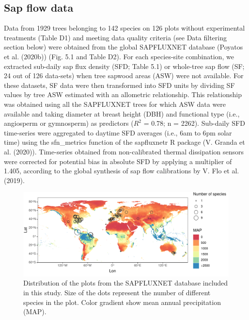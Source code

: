 \documentclass[11pt,twoside]{reedthesis}
\begin{document}
\subsection{Sap flow data}\label{sap-flow-data}

Data from 1929 trees belonging to 142 species on 126 plots without
experimental treatments (Table D1) and meeting data quality criteria
(see Data filtering section below) were obtained from the global
SAPFLUXNET database (Poyatos et al. (2020b)) (Fig. 5.1 and Table D2).
For each species-site combination, we extracted sub-daily sap flux
density (SFD; Table 5.1) or whole-tree sap flow (SF; 24 out of 126
data-sets) when tree sapwood areas (ASW) were not available. For these
datasets, SF data were then transformed into SFD units by dividing SF
values by tree ASW estimated with an allometric relationship. This
relationship was obtained using all the SAPFLUXNET trees for which ASW
data were available and taking diameter at breast height (DBH) and
functional type (i.e., angiosperm or gymnosperm) as predictors (\(R^2\)
= 0.78; n = 2262). Sub-daily SFD time-series were aggregated to daytime
SFD averages (i.e., 6am to 6pm solar time) using the sfn\_metrics
function of the sapfluxnetr R package (V. Granda et al. (2020)).
Time-series obtained from non-calibrated thermal dissipation sensors
were corrected for potential bias in absolute SFD by applying a
multiplier of 1.405, according to the global synthesis of sap flow
calibrations by V. Flo et al. (2019).\par
\begin{figure}[hbt!]

{\centering \includegraphics[width=1\linewidth]{figure/CH5/Figure_1} 

}

\caption[Distribution of the plots from the SAPFLUXNET database included in this study.]{Distribution of the plots from the SAPFLUXNET database included in this study. Size of the dots represent the number of different species in the plot. Color gradient show mean annual precipitation (MAP).}\label{fig:ch5fig1}
\end{figure}
\end{document}
